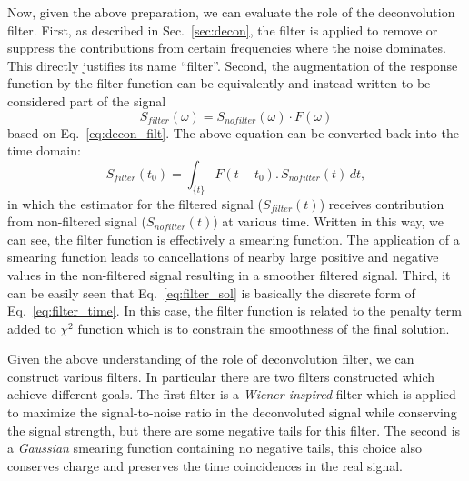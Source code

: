 Now, given the above preparation, we can evaluate the role of the 
deconvolution filter. 
First, as described in Sec.~\ref{sec:decon}, the filter is applied to remove 
or suppress the contributions from certain frequencies where the noise 
dominates. This directly justifies its name ``filter''. 
%
Second, the augmentation of the response function by the filter
function can be equivalently and instead written to be considered part
of the signal
\begin{equation}
S_{filter}(\omega) = S_{nofilter} (\omega) \cdot F (\omega) 
\end{equation}
based on Eq.~\ref{eq:decon_filt}.
The above equation can be converted back into the time domain:
\begin{equation}\label{eq:filter_time}
S_{filter}(t_0) = \int_{\{t\}} F(t-t_0) .\, S_{nofilter}(t) \, dt,  
\end{equation}
in which the estimator for the filtered signal ($S_{filter}(t)$) receives contribution 
from non-filtered signal ($S_{nofilter}(t)$) at various time. 
Written in this way, we can see, the filter function is effectively 
a smearing function. The application of a smearing function leads 
to cancellations of nearby large positive and negative values in the 
non-filtered signal resulting in a smoother filtered signal. 
Third, it can be easily seen that Eq.~\ref{eq:filter_sol} is 
basically the discrete form of Eq.~\ref{eq:filter_time}. In this 
case, the filter function is related to the penalty term added to 
$\chi^2$ function which is to constrain the smoothness of the final 
solution. 

Given the above understanding of the role of deconvolution filter, we
can construct various filters.  In particular there are two filters
constructed which achieve different goals.  The first filter is a
\textit{Wiener-inspired}\cite{wiener} filter which is applied to
maximize the signal-to-noise ratio in the deconvoluted signal while
conserving the signal strength, but there are some negative tails 
for this filter. The second is a \textit{Gaussian}
smearing function containing no negative tails, this choice also
conserves charge and
preserves the time coincidences in the real signal.


